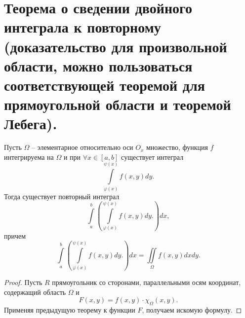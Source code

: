 \section{Теорема о сведении двойного интеграла к повторному (доказательство для произвольной области, можно пользоваться соответствующей теоремой для прямоугольной области и теоремой Лебега).}

\begin{theorem}
    Пусть $\Omega$ -- элементарное относительно оси $O_x$ множество, функция $f$ интегрируема на $\Omega$ и при $\forall x \in [a, b]$ существует интеграл
    \[
        \int \limits_{\varphi(x)}^{\psi(x)} f(x,y) dy.
    \]
    Тогда существует повторный интеграл
    \[
        \int \limits_a^b
        \left(
            \int \limits_{\varphi(x)}^{\psi(x)} f(x,y) dy.
        \right) dx,
    \] причем
    \[
        \int \limits_a^b
        \left(
            \int \limits_{\varphi(x)}^{\psi(x)} f(x,y) dy.
        \right) dx
        =
        \iint \limits_{\Omega} f(x,y) dx dy.
    \]
    \begin{proof}
        Пусть $R$ прямоугольник со сторонами, параллельными осям координат, содержащий область $\Omega$ и
        \[
            F(x,y) = f(x,y) \cdot \chi_\Omega (x,y).
        \]
        Применяя предыдущую теорему к функции $F$, получаем искомую формулу.
    \end{proof}
\end{theorem}